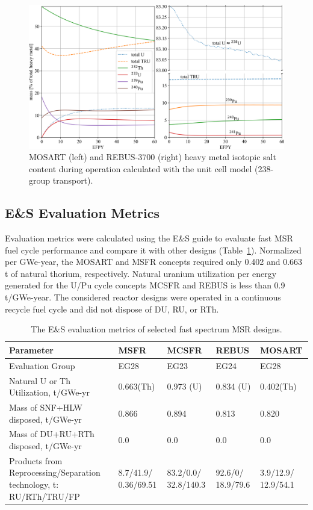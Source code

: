 \documentclass[letterpaper]{mandc2019}
\begin{document}
\begin{figure}[t!]
  \centering
  \includegraphics[width=\textwidth]{./Figures/mosart_rebus_balance.png}
  	  \vspace{-0.2in}
  \caption{\gls{MOSART} (left) and REBUS-3700 (right) heavy metal isotopic salt content during operation calculated with the unit cell model (238-group transport).}
  \label{fig:mosart-balance}
\end{figure}
\subsection{E\&S Evaluation Metrics}
\label{sec:metrics}
Evaluation metrics were calculated using the E\&S guide \cite{wigeland_nuclear_2014-4} to evaluate fast \gls{MSR} fuel cycle performance and compare it with other designs (Table~\ref{table:metrics}). 
Normalized per GWe-year, the \gls{MOSART} and \gls{MSFR} concepts required only 0.402 and 0.663 t of natural thorium, respectively. 
Natural uranium utilization per energy generated for the U/Pu cycle concepts \gls{MCSFR} and REBUS is less than 0.9 t/GWe-year. 
The considered reactor designs were operated in a continuous recycle fuel cycle and did not dispose of DU, RU, or RTh.

\begin{table}[t!]
  \vspace{-0.5in}
  \centering
  \caption{The E\&S evaluation metrics of selected fast spectrum \gls{MSR} designs.}
  \label{table:metrics}
  \begin{tabular}{p{} p{} p{} p{} p{}} \toprule
   Parameter &  \gls{MSFR} & \gls{MCSFR} & REBUS & \gls{MOSART} \\ \midrule
   Evaluation Group	&  EG28 & EG23 & EG24 & EG28   \\
   Natural U or Th Utilization, t/GWe-yr & 0.663(Th) & 0.973 (U) & 0.834 (U) & 0.402(Th) \\
   Mass of \gls{SNF}+\gls{HLW} disposed, t/GWe-yr & 0.866 & 0.894 & 0.813 &  0.820 \\
   Mass of DU+RU+RTh disposed, t/GWe-yr & 0.0 & 0.0 & 0.0 &  0.0 \\
   Products from Reprocessing/Separation technology, t: \gls{RU}/\gls{RTh}/\gls{TRU}/\gls{FP} &
   8.7/41.9/ 0.36/69.51 &  83.2/0.0/ 32.8/140.3 & 92.6/0/ 18.9/79.6 & 3.9/12.9/ 12.9/54.1  \\
 \bottomrule
  \end{tabular}
\end{table}
\end{document}
